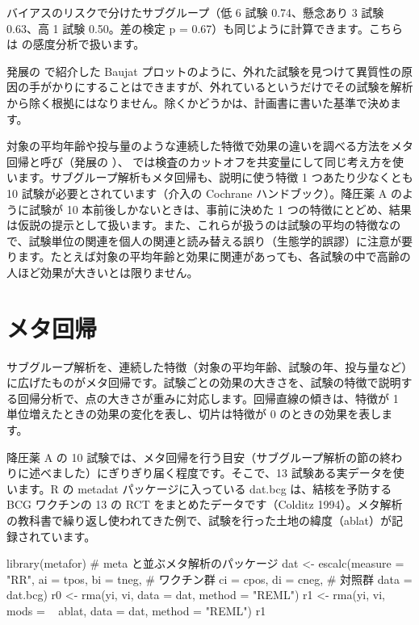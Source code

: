 バイアスのリスクで分けたサブグループ（低 6 試験 0.74、懸念あり 3 試験 0.63、高 1 試験 0.50。差の検定 p = 0.67）も同じように計算できます。こちらは  の感度分析で扱います。

発展の  で紹介した Baujat プロットのように、外れた試験を見つけて異質性の原因の手がかりにすることはできますが、外れているというだけでその試験を解析から除く根拠にはなりません。除くかどうかは、計画書に書いた基準で決めます。

対象の平均年齢や投与量のような連続した特徴で効果の違いを調べる方法をメタ回帰と呼び（発展の ）、 では検査のカットオフを共変量にして同じ考え方を使います。サブグループ解析もメタ回帰も、説明に使う特徴 1 つあたり少なくとも 10 試験が必要とされています（介入の Cochrane ハンドブック）。降圧薬 A のように試験が 10 本前後しかないときは、事前に決めた 1 つの特徴にとどめ、結果は仮説の提示として扱います。また、これらが扱うのは試験の平均の特徴なので、試験単位の関連を個人の関連と読み替える誤り（生態学的誤謬）に注意が要ります。たとえば対象の平均年齢と効果に関連があっても、各試験の中で高齢の人ほど効果が大きいとは限りません。

\section{\hatten メタ回帰}
\label{sec:06-5}

サブグループ解析を、連続した特徴（対象の平均年齢、試験の年、投与量など）に広げたものがメタ回帰です。試験ごとの効果の大きさを、試験の特徴で説明する回帰分析で、点の大きさが重みに対応します。回帰直線の傾きは、特徴が 1 単位増えたときの効果の変化を表し、切片は特徴が 0 のときの効果を表します。

降圧薬 A の 10 試験では、メタ回帰を行う目安（サブグループ解析の節の終わりに述べました）にぎりぎり届く程度です。そこで、13 試験ある実データを使います。R の metadat パッケージに入っている dat.bcg は、結核を予防する BCG ワクチンの 13 の RCT をまとめたデータです（Colditz 1994）。メタ解析の教科書で繰り返し使われてきた例で、試験を行った土地の緯度（ablat）が記録されています。

\begin{rcode}
library(metafor)   # meta と並ぶメタ解析のパッケージ
dat <- escalc(measure = "RR",
              ai = tpos, bi = tneg,   # ワクチン群
              ci = cpos, di = cneg,   # 対照群
              data = dat.bcg)
r0 <- rma(yi, vi, data = dat, method = "REML")
r1 <- rma(yi, vi, mods = ~ ablat, data = dat,
          method = "REML")
r1
\end{rcode}

